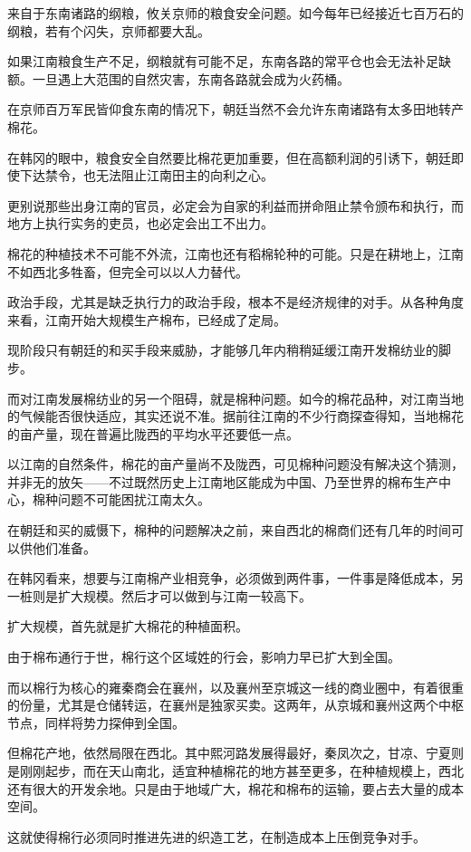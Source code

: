 来自于东南诸路的纲粮，攸关京师的粮食安全问题。如今每年已经接近七百万石的纲粮，若有个闪失，京师都要大乱。

如果江南粮食生产不足，纲粮就有可能不足，东南各路的常平仓也会无法补足缺额。一旦遇上大范围的自然灾害，东南各路就会成为火药桶。

在京师百万军民皆仰食东南的情况下，朝廷当然不会允许东南诸路有太多田地转产棉花。

在韩冈的眼中，粮食安全自然要比棉花更加重要，但在高额利润的引诱下，朝廷即使下达禁令，也无法阻止江南田主的向利之心。

更别说那些出身江南的官员，必定会为自家的利益而拼命阻止禁令颁布和执行，而地方上执行实务的吏员，也必定会出工不出力。

棉花的种植技术不可能不外流，江南也还有稻棉轮种的可能。只是在耕地上，江南不如西北多牲畜，但完全可以以人力替代。

政治手段，尤其是缺乏执行力的政治手段，根本不是经济规律的对手。从各种角度来看，江南开始大规模生产棉布，已经成了定局。

现阶段只有朝廷的和买手段来威胁，才能够几年内稍稍延缓江南开发棉纺业的脚步。

而对江南发展棉纺业的另一个阻碍，就是棉种问题。如今的棉花品种，对江南当地的气候能否很快适应，其实还说不准。据前往江南的不少行商探查得知，当地棉花的亩产量，现在普遍比陇西的平均水平还要低一点。

以江南的自然条件，棉花的亩产量尚不及陇西，可见棉种问题没有解决这个猜测，并非无的放矢——不过既然历史上江南地区能成为中国、乃至世界的棉布生产中心，棉种问题不可能困扰江南太久。

在朝廷和买的威慑下，棉种的问题解决之前，来自西北的棉商们还有几年的时间可以供他们准备。

在韩冈看来，想要与江南棉产业相竞争，必须做到两件事，一件事是降低成本，另一桩则是扩大规模。然后才可以做到与江南一较高下。

扩大规模，首先就是扩大棉花的种植面积。

由于棉布通行于世，棉行这个区域姓的行会，影响力早已扩大到全国。

而以棉行为核心的雍秦商会在襄州，以及襄州至京城这一线的商业圈中，有着很重的份量，尤其是仓储转运，在襄州是独家买卖。这两年，从京城和襄州这两个中枢节点，同样将势力探伸到全国。

但棉花产地，依然局限在西北。其中熙河路发展得最好，秦凤次之，甘凉、宁夏则是刚刚起步，而在天山南北，适宜种植棉花的地方甚至更多，在种植规模上，西北还有很大的开发余地。只是由于地域广大，棉花和棉布的运输，要占去大量的成本空间。

这就使得棉行必须同时推进先进的织造工艺，在制造成本上压倒竞争对手。

